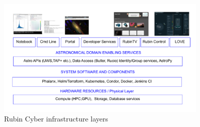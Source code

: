 \newpage

\begin{figure}
\begin{centering}
\includegraphics[width=0.9\textwidth]{images/CI-Rubin}
	\caption{Rubin Cyber infrastructure layers
\label{fig:ci-rubin}}
\end{centering}
\end{figure}


